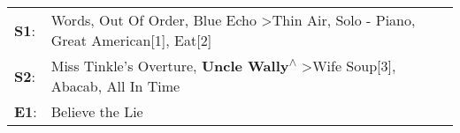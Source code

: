 \begin{supertabular}{p{0.03\textwidth}p{0.92\textwidth}}
 \textbf{S1}:  &  Words\textsuperscript{}, \enspace Out Of Order\textsuperscript{}, \enspace Blue Echo\textsuperscript{} \textgreater \enspace Thin Air\textsuperscript{}, \enspace Solo - Piano\textsuperscript{}, \enspace Great American[1]\textsuperscript{}, \enspace Eat[2]\textsuperscript{}  \enspace  \\
 \textbf{S2}:  &                                                  Miss Tinkle's Overture\textsuperscript{}, \enspace \textbf{Uncle Wally\textsuperscript{$\wedge$}} \textgreater \enspace Wife Soup[3]\textsuperscript{}, \enspace Abacab\textsuperscript{}, \enspace All In Time\textsuperscript{}  \enspace  \\
 \textbf{E1}:  &                                                                                                                                                                                                                                                  Believe the Lie\textsuperscript{}  \enspace  \\
\end{supertabular}
